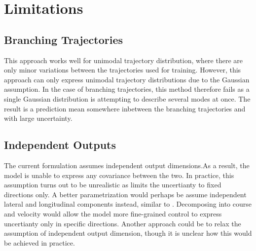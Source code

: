 \section{Limitations}

\subsection{Branching Trajectories}
This approach works well for unimodal trajectory distribution, where there are only minor variations between the trajectories used for training. However, this approach can only express unimodal trajectory distributions due to the Gaussian assumption. In the case of branching trajectories, this method therefore fails as a single Gaussian distribution is attempting to describe several modes at once. The result is a prediction mean somewhere inbetween the branching trajectories and with large uncertainty. 

\subsection{Independent Outputs}
The current formulation assumes independent output dimensions.As a result, the model is unable to express any covariance between the two. In practice, this assumption turns out to be unrealistic as limits the uncertianty to fixed directions only. A better parametrization would perhaps be assume independent lateral and longitudinal components instead, similar to \cite{gp_ais_trajectory}. Decomposing into course and velocity would allow the model more fine-grained control to express uncertianty only in specific directions. Another approach could be to relax the assumption of independent output dimension, though it is unclear how this would be achieved in practice. 


